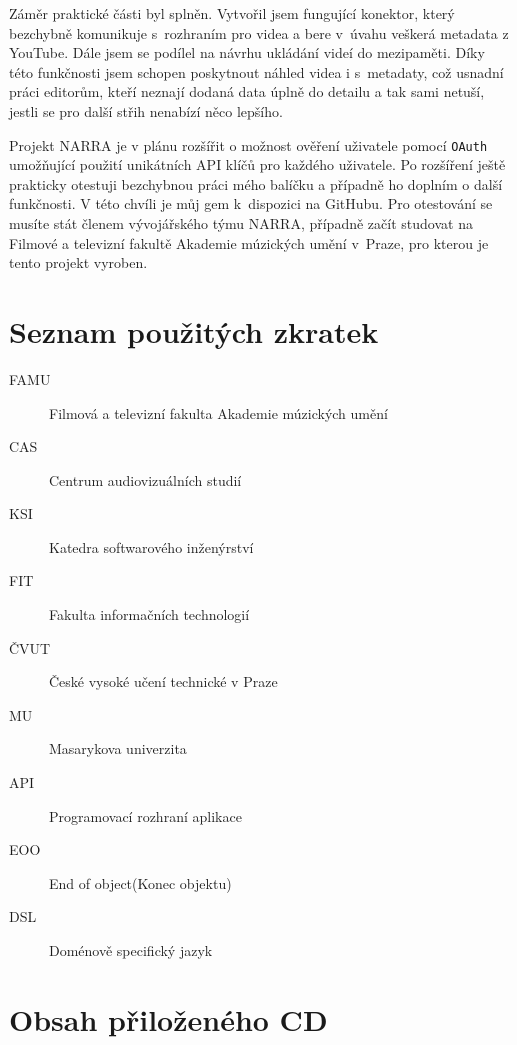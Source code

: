 \documentclass[thesis=B,czech]{FITthesis}[2012/06/26]
\begin{document}
\begin{conclusion}
	\par Záměr praktické části byl splněn. Vytvořil jsem fungující konektor, který bezchybně komunikuje s~rozhraním pro videa a bere v~úvahu veškerá metadata z YouTube. Dále jsem se podílel na návrhu ukládání videí do mezipaměti. Díky této funkčnosti jsem schopen poskytnout náhled videa i s~metadaty, což usnadní práci editorům, kteří neznají dodaná data úplně do detailu a tak sami netuší, jestli se pro další střih nenabízí něco lepšího.
	\par Projekt NARRA je v plánu rozšířit o možnost ověření uživatele pomocí \texttt{OAuth} umožňující použití unikátních API klíčů pro každého uživatele. Po rozšíření ještě prakticky otestuji bezchybnou práci mého balíčku a případně ho doplním o další funkčnosti. V této chvíli je můj gem k~dispozici na GitHubu\cite{myself}. Pro otestování se musíte stát členem vývojářského týmu NARRA, případně začít studovat na Filmové a televizní fakultě Akademie múzických umění v~Praze, pro kterou je tento projekt vyroben.
\end{conclusion}




\appendix

\chapter{Seznam použitých zkratek}
\begin{description}
	\item[FAMU] Filmová a televizní fakulta Akademie múzických umění
	\item[CAS] Centrum audiovizuálních studií
	\item[KSI] Katedra softwarového inženýrství
	\item[FIT] Fakulta informačních technologií
	\item[ČVUT] České vysoké učení technické v Praze
	\item[MU] Masarykova univerzita
	\item[API] Programovací rozhraní aplikace
	\item[EOO] End of object(Konec objektu)
	\item[DSL] Doménově specifický jazyk
\end{description}


\chapter{Obsah přiloženého CD}

\begin{figure}
\end{figure}
\end{document}
